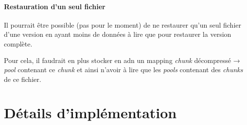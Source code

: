 \documentclass[a4paper]{report}
\begin{document}
\subsubsection{Restauration d'un seul fichier}

Il pourrait être possible (pas pour le moment) de ne restaurer qu'un
seul fichier d'une version en ayant moins de données à lire que pour
restaurer la version complète.

Pour cela, il faudrait en plus stocker en \ac{adn} un mapping \emph{chunk}
décompressé → \emph{pool} contenant ce \emph{chunk} et ainsi n'avoir à
lire que les \emph{pools} contenant des \emph{chunks} de ce fichier.



\chapter{Détails d'implémentation}











\end{document}

